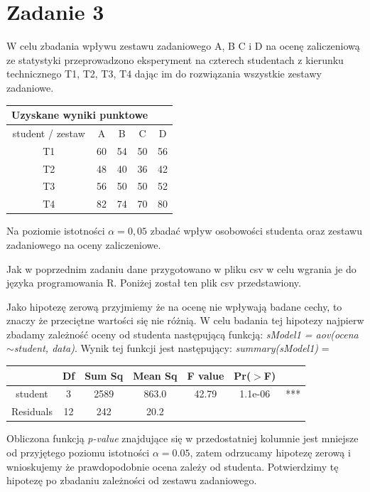 \documentclass{article}
\begin{document}
\newpage
\section{Zadanie 3}
W celu zbadania wpływu zestawu zadaniowego A, B C i D na ocenę zaliczeniową ze
statystyki przeprowadzono eksperyment na czterech studentach z kierunku
technicznego T1, T2, T3, T4 dając im do rozwiązania wszystkie zestawy zadaniowe.
\begin{center} \begin{tabular}{|c|cccc|} 
\multicolumn{4}{c}{Uzyskane wyniki punktowe} \\ \hline
student / zestaw & A & B & C & D \\ \hline
T1 & 60 & 54 & 50 & 56 \\ \hline
T2 & 48 & 40 & 36 & 42 \\ \hline
T3 & 56 & 50 & 50 & 52 \\ \hline
T4 & 82 & 74 & 70 & 80 \\ \hline
\end{tabular} \end{center}
Na poziomie istotności $\alpha = 0,05$ zbadać wpływ osobowości studenta oraz zestawu
zadaniowego na oceny zaliczeniowe. \\ \par

Jak w poprzednim zadaniu dane przygotowano w pliku csv w celu wgrania je do języka programowania R. Poniżej został ten plik csv przedstawiony.
\begin{center}
\end{center}

Jako hipotezę zerową przyjmiemy że na ocenę nie wpływają badane cechy, to znaczy że przeciętne wartości się nie różnią. W celu badania tej hipotezy najpierw zbadamy zależność oceny od studenta następującą funkcją: \textit{sModel1 = aov(ocena$\sim$student, data)}. Wynik tej funkcji jest następujący: \textit{summary(sModel1)} =
\begin{center} \begin{tabular}{|c|c|c|c|c|c|c|} \hline
& Df & Sum Sq & Mean Sq & F value & Pr($>$F) & \\ \hline
student & 3 & 2589 & 863.0 & 42.79 & 1.1e-06 & *** \\ \hline
Residuals & 12 & 242 & 20.2 & & & \\ \hline
\end{tabular} \end{center}
Obliczona funkcją \textit{p-value} znajdujące się w przedostatniej kolumnie jest mniejsze od przyjętego poziomu istotności $\alpha = 0.05$, zatem odrzucamy hipotezę zerową i wnioskujemy że prawdopodobnie ocena zależy od studenta. Potwierdzimy tę hipotezę po zbadaniu zależności od zestawu zadaniowego. \\ \par
\end{document}
